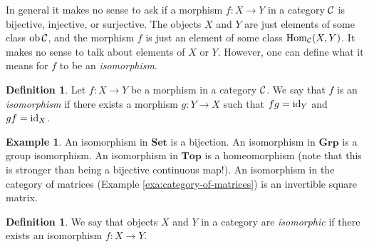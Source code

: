 \documentclass[11pt]{amsbook}
\DeclareMathOperator\Hom{Hom}
\DeclareMathOperator\ob{ob}
\def\id{{\rm id}}
\def\Set{\mathbf{Set}}
\def\Top{\mathbf{Top}}
\def\Grp{\mathbf{Grp}}
\theoremstyle{plain}
\theoremstyle{definition}
\newtheorem{definition}[theorem]{Definition}
\newtheorem{example}[theorem]{Example}
\begin{document}
In general it makes no sense to ask if a morphism $f\colon X\to Y$ in a category ${\mathcal{C}}$ is bijective, injective, or surjective. The objects $X$ and $Y$ are just elements of some class $\ob \cC$, and the morphism $f$ is just an element of some class $\Hom_\cC(X,Y)$.  It makes no sense to talk about elements of $X$ or $Y$. However, one can define what it means for $f$ to be an \emph{isomorphism}.


\begin{definition}Let $f\colon X\to Y$ be a morphism in a category ${\mathcal{C}}$. We say that $f$ is an \emph{isomorphism} if there exists a morphism $g\colon Y \to X$ such that $fg=\id_Y$ and $gf=\id_X$.
\end{definition}

\begin{example}An isomorphism in $\Set$ is a bijection. An isomorphism in $\Grp$ is a group isomorphism. An isomorphism in $\Top$ is a homeomorphism (note that this is stronger than being a bijective continuous map!). An isomorphism in the category of matrices (Example \ref{exa:category-of-matrices}) is an invertible square matrix.
\end{example}

\begin{definition}We say that objects $X$ and $Y$ in a category are \emph{isomorphic} if there exists an isomorphism $f\colon X\to Y$.
\end{definition}
\end{document}
